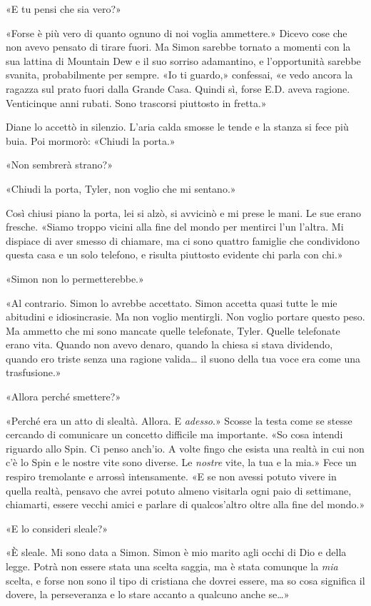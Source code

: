 «E tu pensi che sia vero?»

«Forse è più vero di quanto ognuno di noi voglia ammettere.» Dicevo cose
che non avevo pensato di tirare fuori. Ma Simon sarebbe tornato a
momenti con la sua lattina di Mountain Dew e il suo sorriso adamantino,
e l'opportunità sarebbe svanita, probabilmente per sempre. «Io ti
guardo,» confessai, «e vedo ancora la ragazza sul prato fuori dalla
Grande Casa. Quindi sì, forse E.D. aveva ragione. Venticinque anni
rubati. Sono trascorsi piuttosto in fretta.»

Diane lo accettò in silenzio. L'aria calda smosse le tende e la stanza
si fece più buia. Poi mormorò: «Chiudi la porta.»

«Non sembrerà strano?»

«Chiudi la porta, Tyler, non voglio che mi sentano.»

Così chiusi piano la porta, lei si alzò, si avvicinò e mi prese le mani.
Le sue erano fresche. «Siamo troppo vicini alla fine del mondo per
mentirci l'un l'altra. Mi dispiace di aver smesso di chiamare, ma ci
sono quattro famiglie che condividono questa casa e un solo telefono, e
risulta piuttosto evidente chi parla con chi.»

«Simon non lo permetterebbe.»

«Al contrario. Simon lo avrebbe accettato. Simon accetta quasi tutte le
mie abitudini e idiosincrasie. Ma non voglio mentirgli. Non voglio
portare questo peso. Ma ammetto che mi sono mancate quelle telefonate,
Tyler. Quelle telefonate erano vita. Quando non avevo denaro, quando la
chiesa si stava dividendo, quando ero triste senza una ragione
valida\ldots{} il suono della tua voce era come una trasfusione.»

«Allora perché smettere?»

«Perché era un atto di slealtà. Allora. E \emph{adesso}.» Scosse la
testa come se stesse cercando di comunicare un concetto difficile ma
importante. «So cosa intendi riguardo allo Spin. Ci penso anch'io. A
volte fingo che esista una realtà in cui non c'è lo Spin e le nostre
vite sono diverse. Le \emph{nostre} vite, la tua e la mia.» Fece un
respiro tremolante e arrossì intensamente. «E se non avessi potuto
vivere in quella realtà, pensavo che avrei potuto almeno visitarla ogni
paio di settimane, chiamarti, essere vecchi amici e parlare di
qualcos'altro oltre alla fine del mondo.»

«E lo consideri sleale?»

«È sleale. Mi sono data a Simon. Simon è mio marito agli occhi di Dio e
della legge. Potrà non essere stata una scelta saggia, ma è stata
comunque la \emph{mia} scelta, e forse non sono il tipo di cristiana che
dovrei essere, ma so cosa significa il dovere, la perseveranza e lo
stare accanto a qualcuno anche se\ldots»


